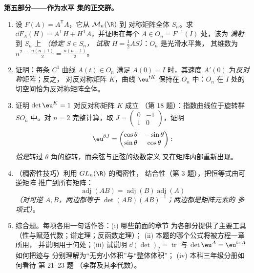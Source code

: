 \begin{problem}
\medskip
\noindent\textbf{第五部分——作为水平
集的正交群。}
\begin{enumerate}[resume]
  \item 设 $F(A) = A^{\mathsf T}A$，它从 $\mathcal M_n(\R)$ 到
        对称矩阵全体 $S_n$。求 $\dd F_A(H) =
        A^{\mathsf T}H + H^{\mathsf T}A$，并证明在每个
        $A \in O_n = F^{-1}(I)$ 处，该为
        \emph{满射}到 $S_n$ 上 \emph{（给定 $S \in S_n$，
        试取 $H = \frac12 AS$）}：$O_n$ 是光滑水平集，
        其维数为 $n^2 - \frac{n(n+1)}2 = \frac{n(n-1)}2$。
  \item 证明：每条 $C^1$ 曲线 $A(t) \in O_n$ 满足 $A(0) =
        I$ 时，其速度 $A'(0)$ 为\emph{反对称}矩阵；反之，
        对反对称矩阵 $K$，曲线
        $\eu^{tK}$ 保持在 $O_n$ 中：$O_n$ 在
        $I$ 处的切空间恰为反对称矩阵全体。
  \item 证明 $\det\eu^{K} = 1$ 对反对称矩阵 $K$ 成立
        （第 18 题）：指数曲线位于旋转群
        $SO_n$ 中。对 $n = 2$ 完整计算，取 $J =
        \begin{pmatrix}0 & -1\\ 1 & 0\end{pmatrix}$，证明
        \[
        \eu^{\theta J} = \begin{pmatrix} \cos\theta &
        -\sin\theta\\ \sin\theta & \cos\theta\end{pmatrix} :
        \]
        \emph{恰是}转过
        $\theta$ 角的旋转，而余弦与正弦的级数定义
        又在矩阵内部重新出现。
  \item （稠密性技巧）利用 $GL_n(\R)$ 的稠密性，
        结合性（第 3 题），把恒等式由可逆矩阵
        推广到所有矩阵：
        \[
        \operatorname{adj}(AB) =
        \operatorname{adj}(B)\operatorname{adj}(A)
        \]
        \emph{（对可逆 $A, B$，两边都等于
        $\det(AB)(AB)^{-1}$；两边都是矩阵元素的
        多项式）}。
  \item 综合题。每项各用一句话作答：(i) 哪些前面的章节
        为各部分提供了主要工具
        （性与赋范代数；谱定理；反函数定理）；
        (ii) 本题的哪个公式将被方程一章所用，
        并说明用于何处；(iii) 试说明
        $\dd(\det)_I = \operatorname{tr}$ 与 $\det\eu^A =
        \eu^{\operatorname{tr}A}$ 如何把迹与
        分别理解为“无穷小体积”与“整体体积”；
        (iv) 本科三年级分册如何看待
        第 21--23 题
        （李群及其李代数）。
\end{enumerate}
\end{problem}
